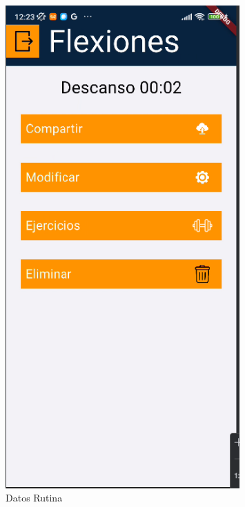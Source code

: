 \begin{figure}[H]
   \centering
    \includegraphics[width=0.8\textwidth]{pantallas/DatosRutina.png}
    \caption{Datos Rutina}
    \label{fig:DatosRutina}
\end{figure}

